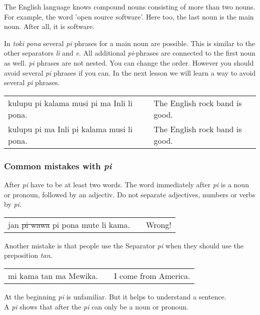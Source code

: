 The English language knows compound nouns consisting of more than two nouns. 
For example, the word 'open source software'.  
Here too, the last noun is the main noun. 
After all, it is software. 

In \textit{toki pona} several \textit{pi} phrases for a main noun are possible. 
This is similar to the other separators \textit{li} and \textit{e}. 
All additional \textit{pi}-phrases are connected to the first noun as well. 
\textit{pi} phrases are not nested. 
You can change the order. 
However you should avoid several \textit{pi} phrases if you can. 
In the next lesson we will learn a way to avoid several \textit{pi} phrases.

\begin{supertabular}{p{5,5cm}|ll}
kulupu pi kalama musi pi ma Inli li pona. &&  The English rock band is good. \\ 
kulupu pi ma Inli pi kalama musi li pona. &&  The English rock band is good. \\ 
\end{supertabular}

% 
\label{'mistakes_with_pi'}
\subsubsection*{Common mistakes with \textit{pi}}
%
After \textit{pi} have to be at least two words. 
The word immediately after \textit{pi} is a noun or pronoun, followed by an adjectiv.
Do not separate adjectives, numbers or verbs by \textit{pi}.

\begin{supertabular}{p{5,5cm}|ll}
jan \sout{pi wawa} pi pona mute li kama. && Wrong! \\ %
\end{supertabular}

Another mistake is that people use the Separator \textit{pi} when they should use the preposition \textit{tan}. 

\begin{supertabular}{p{5,5cm}|ll}
mi kama tan ma Mewika. && I come from America. \\
\end{supertabular}  

At the beginning \textit{pi} is unfamiliar. 
But it helps to understand a sentence. \\
A \textit{pi} shows that after the \textit{pi} can only be a noun or pronoun.

